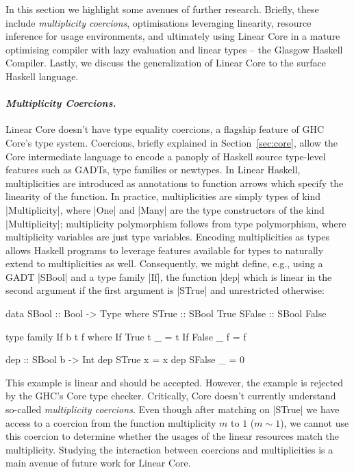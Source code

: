 \documentclass[acmsmall, screen, review]{acmart}
\newcommand{\parawith}[1]{\paragraph{\emph{#1}}}
\begin{document}
In this section we highlight some avenues of further research. Briefly,
these include \emph{multiplicity coercions}, optimisations leveraging
linearity, resource inference for usage environments, and ultimately using
Linear Core in a mature optimising compiler with lazy evaluation and linear
types -- the Glasgow Haskell Compiler. Lastly, we discuss the
generalization of Linear Core to the surface Haskell language.

\parawith{Multiplicity Coercions.}
Linear Core doesn't have type equality coercions, a flagship feature of GHC
Core's type system.
%
Coercions, briefly explained in Section~\ref{sec:core},
allow the Core intermediate language to encode a panoply of Haskell source
type-level features such as GADTs, type families or newtypes.
%
In Linear Haskell, multiplicities are introduced as annotations to function
arrows which specify the linearity of the function. In practice,
multiplicities are simply types of kind |Multiplicity|, where |One| and |Many|
are the type constructors of the kind |Multiplicity|; multiplicity polymorphism
follows from type polymorphism, where multiplicity variables are
just type variables. Encoding multiplicities as types allows Haskell programs
to leverage features available for types to naturally extend to multiplicities
as well.
%
Consequently, we might define, e.g., using a GADT |SBool| and a type family
|If|, the function |dep| which is linear in the second argument if the first
argument is |STrue| and unrestricted otherwise:
%
\begin{limitation}
\begin{code}
data SBool :: Bool -> Type where
  STrue :: SBool True
  SFalse :: SBool False

type family If b t f where
  If True t _ = t
  If False _ f = f

dep :: SBool b -> Int %
dep STrue x = x
dep SFalse _ = 0
\end{code}
\end{limitation}
%
This example is linear and should be accepted. However, the example is rejected
by the GHC's Core type checker. Critically, Core doesn't currently understand
so-called \emph{multiplicity coercions}. Even though after matching on |STrue|
we have access to a coercion from the function multiplicity $m$ to $1$ ($m \sim
1$), we cannot use this coercion to determine whether the usages of the linear
resources match the multiplicity.
%
Studying the interaction between coercions and multiplicities is a main avenue
of future work for Linear Core.
\end{document}
